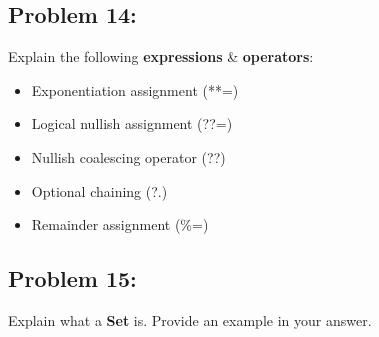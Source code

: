 \documentclass{article}
\begin{document}
\subsection*{Problem 14:}
Explain the following \textbf{expressions} \& \textbf{operators}:
\begin{itemize}
  \item Exponentiation assignment (**=)
  \item Logical nullish assignment (??=)
  \item Nullish coalescing operator (??)
  \item Optional chaining (?.)
  \item Remainder assignment (\%=)
\end{itemize}

\subsection*{Problem 15:}
Explain what a \textbf{Set} is. Provide an example in your answer.
\end{document}
